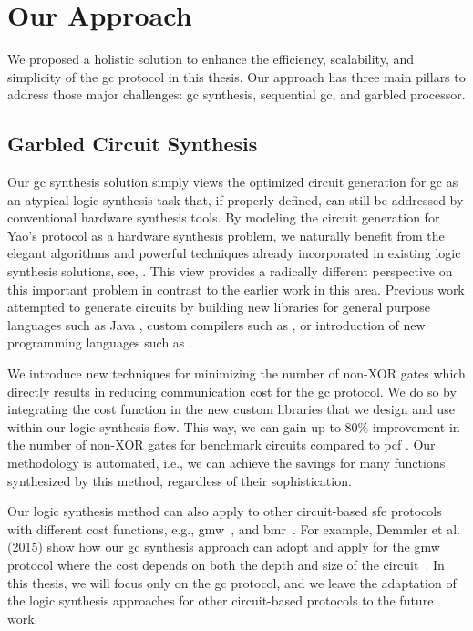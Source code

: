 \section{Our Approach}
We proposed a holistic solution to enhance the efficiency, scalability, and simplicity of the \acrshort{gc} protocol in this thesis.
Our approach has three main pillars to address those major challenges: \acrlong{gc} synthesis, sequential \acrlong{gc}, and garbled processor.

\subsection{Garbled Circuit Synthesis}
Our \acrfull{gc} synthesis solution simply views the optimized circuit generation for \acrshort{gc} as an atypical logic synthesis task that, if properly defined, can still be addressed by conventional hardware synthesis tools.
By modeling the circuit generation for Yao's protocol as a hardware synthesis problem, we naturally benefit from the elegant algorithms and powerful techniques already incorporated in existing logic synthesis solutions, see, \cite{sentovich1992sis,micheli1994synthesis,devadas1994logic,brayton1987mis}.
This view provides a radically different perspective on this important problem in contrast to the earlier work in this area.
Previous work attempted to generate circuits by building new libraries for general purpose languages such as Java \cite{huang2011faster,malka2011vmcrypt}, custom compilers such as \cite{kreuter2013pcf,franz2014cbmc}, or introduction of new programming languages such as \cite{malkhi2004fairplay,rastogi2014wysteria}.

We introduce new techniques for minimizing the number of non-XOR gates which directly results in reducing communication cost for the \acrshort{gc} protocol.
We do so by integrating the cost function in the new custom libraries that we design and use within our logic synthesis flow.
This way, we can gain up to $80\%$ improvement in the number of non-XOR gates for benchmark circuits compared to \gls{pcf} \cite{kreuter2013pcf}.
Our methodology is automated, i.e., we can achieve the savings for many functions synthesized by this method, regardless of their sophistication.

Our logic synthesis method can also apply to other circuit-based \acrshort{sfe} protocols with different cost functions, e.g., \acrfull{gmw}~\cite{goldreich1987play}, and \acrfull{bmr}~\cite{beaver1990round}.
For example, Demmler et al. (2015) show how our \acrshort{gc} synthesis approach can adopt and apply for the \acrshort{gmw} protocol where the cost depends on both the depth and size of the circuit~\cite{demmler2015automated}.
In this thesis, we will focus only on the \acrshort{gc} protocol, and we leave the adaptation of the logic synthesis approaches for other circuit-based protocols to the future work.

